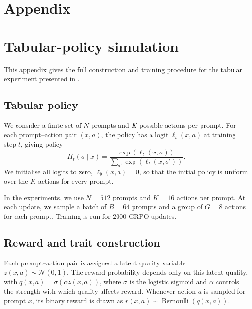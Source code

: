 \section{Appendix}

\section{Tabular-policy simulation}
\label{app:tabular_policy}

This appendix gives the full construction and training procedure for the tabular experiment presented in .

\subsection{Tabular policy}

We consider a finite set of $N$ prompts and $K$ possible actions per prompt. For each prompt--action pair $(x,a)$, the policy has a logit $\ell_t(x,a)$ at training step $t$, giving policy
\begin{equation*}
    \Pi_t(a\mid x)
    =
    \frac{\exp(\ell_t(x,a))}
    {\sum_{a'}\exp(\ell_t(x,a'))}.
\end{equation*}
We initialise all logits to zero, $\ell_0(x,a)=0$, so that the initial policy is uniform over the $K$ actions for every prompt.

In the experiments, we use $N=512$ prompts and $K=16$ actions per prompt. At each update, we sample a batch of $B=64$ prompts and a group of $G=8$ actions for each prompt. Training is run for $2000$ GRPO updates.

\subsection{Reward and trait construction}

Each prompt--action pair is assigned a latent quality variable $z(x,a)\sim\mathcal{N}(0,1)$. The reward probability depends only on this latent quality, with $q(x,a)=\sigma\!\left(\alpha z(x,a)\right)$, where $\sigma$ is the logistic sigmoid and $\alpha$ controls the strength with which quality affects reward. Whenever action $a$ is sampled for prompt $x$, its binary reward is drawn as $r(x,a)\sim\operatorname{Bernoulli}\!\left(q(x,a)\right)$.

